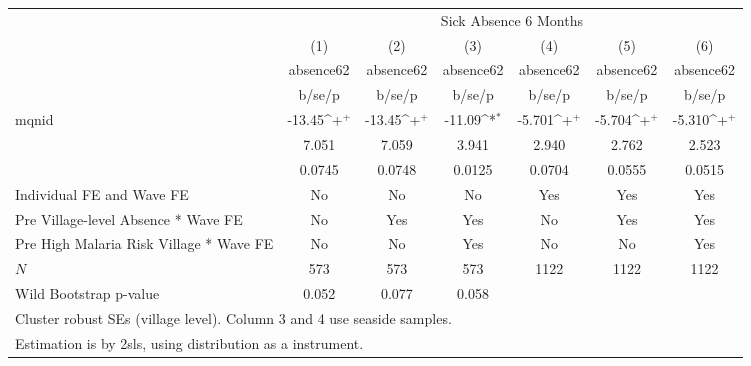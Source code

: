 {
\def\sym#1{\ifmmode^{#1}\else\(^{#1}\)\fi}
\begin{tabular}{l*{6}{c}}
\hline\hline
            &\multicolumn{6}{c}{Sick Absence 6 Months}                                                                                          \\
            &\multicolumn{1}{c}{(1)}&\multicolumn{1}{c}{(2)}&\multicolumn{1}{c}{(3)}&\multicolumn{1}{c}{(4)}&\multicolumn{1}{c}{(5)}&\multicolumn{1}{c}{(6)}\\
            &\multicolumn{1}{c}{absence62}&\multicolumn{1}{c}{absence62}&\multicolumn{1}{c}{absence62}&\multicolumn{1}{c}{absence62}&\multicolumn{1}{c}{absence62}&\multicolumn{1}{c}{absence62}\\
            &      b/se/p         &      b/se/p         &      b/se/p         &      b/se/p         &      b/se/p         &      b/se/p         \\
\hline
mqnid       &      -13.45\sym{+}  &      -13.45\sym{+}  &      -11.09\sym{*}  &      -5.701\sym{+}  &      -5.704\sym{+}  &      -5.310\sym{+}  \\
            &       7.051         &       7.059         &       3.941         &       2.940         &       2.762         &       2.523         \\
            &      0.0745         &      0.0748         &      0.0125         &      0.0704         &      0.0555         &      0.0515         \\
Individual FE and Wave FE &          No         &          No         &          No         &         Yes         &         Yes         &         Yes         \\
Pre Village-level Absence * Wave FE&          No         &         Yes         &         Yes         &          No         &         Yes         &         Yes         \\
Pre High Malaria Risk Village * Wave FE &          No         &          No         &         Yes         &          No         &          No         &         Yes         \\
\hline
\(N\)       &         573         &         573         &         573         &        1122         &        1122         &        1122         \\
Wild Bootstrap p-value &       0.052         &       0.077         &       0.058         &                     &                     &                     \\
\hline\hline
\multicolumn{7}{l}{\footnotesize Cluster robust SEs (village level). Column 3 and 4 use seaside samples.}\\
\multicolumn{7}{l}{\footnotesize Estimation is by 2sls, using distribution as a instrument.}\\
\end{tabular}
}
